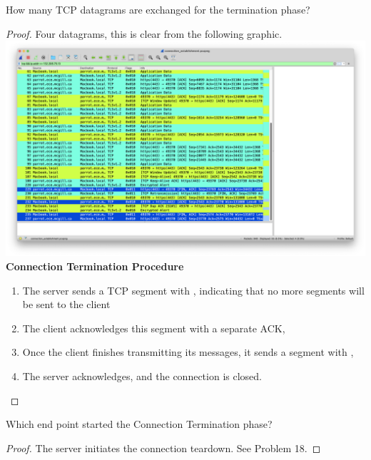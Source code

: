 \documentclass[../main.tex]{subfiles}
\begin{document}
\begin{wts}
	How many TCP datagrams are exchanged for the termination phase?
\end{wts}
\begin{proof}
Four datagrams, this is clear from the following graphic.\\
\includegraphics[width=\textwidth]{subfiles/images/CONNECTION_TERMINATION_Q16.png}
\textbf{Connection Termination Procedure}
\begin{enumerate}
    \item The server  sends a TCP segment with , indicating that no more segments will be sent to the client
    \item The client acknowledges this segment with a separate ACK,
    \item Once the client finishes transmitting its messages, it sends a segment with ,
    \item The server acknowledges, and the connection is closed.
\end{enumerate}

\end{proof}
\newpage


\begin{wts}
	Which end point started the Connection Termination phase?
\end{wts}
\begin{proof}
    The server initiates the connection teardown. See Problem 18.
\end{proof}
\newpage
\end{document}

